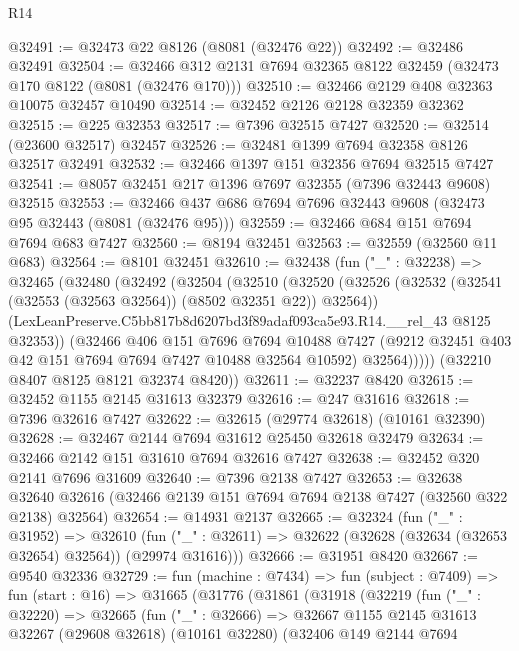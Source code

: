 \begin{lexlean}{R14}
\begin{coremodule}
@32491 := @32473 @22 @8126 (@8081 (@32476 @22))
@32492 := @32486 @32491
@32504 := @32466 @312 @2131 @7694 @32365 @8122 @32459 (@32473 @170 @8122 (@8081 (@32476 @170)))
@32510 := @32466 @2129 @408 @32363 @10075 @32457 @10490
@32514 := @32452 @2126 @2128 @32359 @32362
@32515 := @225 @32353
@32517 := @7396 @32515 @7427
@32520 := @32514 (@23600 @32517) @32457
@32526 := @32481 @1399 @7694 @32358 @8126 @32517 @32491
@32532 := @32466 @1397 @151 @32356 @7694 @32515 @7427
@32541 := @8057 @32451 @217 @1396 @7697 @32355 (@7396 @32443 @9608) @32515
@32553 := @32466 @437 @686 @7694 @7696 @32443 @9608 (@32473 @95 @32443 (@8081 (@32476 @95)))
@32559 := @32466 @684 @151 @7694 @7694 @683 @7427
@32560 := @8194 @32451
@32563 := @32559 (@32560 @11 @683)
@32564 := @8101 @32451
@32610 := @32438
    (fun ("_" : @32238) =>
    @32465
      (@32480
        (@32492
          (@32504
            (@32510
              (@32520
                (@32526 (@32532 (@32541 (@32553 (@32563 @32564)) (@8502 @32351 @22)) @32564))
                (LexLeanPreserve.C5bb817b8d6207bd3f89adaf093ca5e93.R14.__rel_43 @8125 @32353))
              (@32466
                @406
                @151
                @7696
                @7694
                @10488
                @7427
                (@9212 @32451 @403 @42 @151 @7694 @7694 @7427 @10488 @32564 @10592)
                @32564)))))
      (@32210 @8407 @8125 @8121 @32374 @8420))
@32611 := @32237 @8420
@32615 := @32452 @1155 @2145 @31613 @32379
@32616 := @247 @31616
@32618 := @7396 @32616 @7427
@32622 := @32615 (@29774 @32618) (@10161 @32390)
@32628 := @32467 @2144 @7694 @31612 @25450 @32618 @32479
@32634 := @32466 @2142 @151 @31610 @7694 @32616 @7427
@32638 := @32452 @320 @2141 @7696 @31609
@32640 := @7396 @2138 @7427
@32653 := @32638
    @32640
    @32616
    (@32466 @2139 @151 @7694 @7694 @2138 @7427 (@32560 @322 @2138) @32564)
@32654 := @14931 @2137
@32665 := @32324
    (fun ("_" : @31952) =>
    @32610 (fun ("_" : @32611) => @32622 (@32628 (@32634 (@32653 @32654) @32564)) (@29974 @31616)))
@32666 := @31951 @8420
@32667 := @9540 @32336
@32729 := fun (machine : @7434) =>
  fun (subject : @7409) =>
  fun (start : @16) =>
  @31665
    (@31776
      (@31861
        (@31918
          (@32219
            (fun ("_" : @32220) =>
            @32665
              (fun ("_" : @32666) =>
              @32667
                @1155
                @2145
                @31613
                @32267
                (@29608 @32618)
                (@10161 @32280)
                (@32406
                  @149
                  @2144
                  @7694

\end{coremodule}
\end{lexlean}
